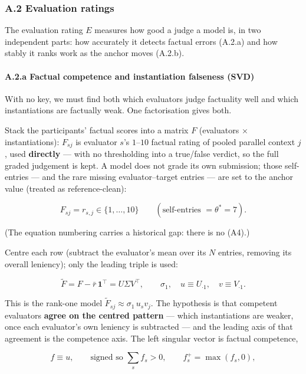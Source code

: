 \subsubsection{A.2 Evaluation ratings}\label{a.2-evaluation-ratings}

The evaluation rating \(E\) measures how good a judge a model is, in two independent parts: how accurately it detects factual errors (A.2.a) and how stably it ranks work as the anchor moves (A.2.b).

\paragraph{A.2.a Factual competence and instantiation falseness (SVD)}\label{a.2.a-factual-competence-and-instantiation-falseness-svd}

With no key, we must find both which evaluators judge factuality well and which instantiations are factually weak. One factorisation gives both.

Stack the participants' factual scores into a matrix \(F\) (evaluators \(\times\) instantiations): \(F_{sj}\) is evaluator \(s\)'s \(1\)--\(10\) factual rating of pooled parallel context \(j\), used \textbf{directly} --- with no thresholding into a true/false verdict, so the full graded judgement is kept. A model does not grade its own submission; those self-entries --- and the rare missing evaluator--target entries --- are set to the anchor value (treated as reference-clean):

\[ F_{sj}=r_{s,j}\in\{1,\dots,10\}\qquad(\text{self-entries }=\theta^{*}=7). \tag{A5}\]

(The equation numbering carries a historical gap: there is no (A4).)

Centre each row (subtract the evaluator's mean over its \(N\) entries, removing its overall leniency); only the leading triple is used:

\[ \tilde F = F-\bar r\,\mathbf 1^{\top}=U\Sigma V^{\top},\qquad \sigma_1,\quad u\equiv U_{\cdot 1},\quad v\equiv V_{\cdot 1}. \tag{A6}\]

This is the rank-one model \(\tilde F_{sj}\approx \sigma_1\,u_s v_j\). The hypothesis is that competent evaluators \textbf{agree on the centred pattern} --- which instantiations are weaker, once each evaluator's own leniency is subtracted --- and the leading axis of that agreement is the competence axis. The left singular vector is factual competence,

\[ f\equiv u,\qquad \text{signed so } \textstyle\sum_s f_s>0,\qquad f^{+}_s=\max(f_s,0), \tag{A7}\]

